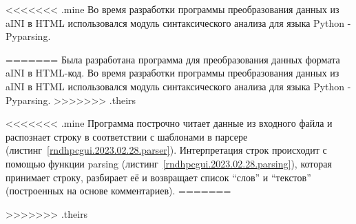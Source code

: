 \def\notedate{2023.02.28}
\def\currentauthor{Василян А.Р. (РК6-83Б)}


<<<<<<< .mine
Во время разработки программы преобразования данных из aINI в HTML использовался модуль синтаксического анализа для языка Python - Pyparsing.

=======
Была разработана программа для преобразования данных формата \textsf{aINI} в \textsf{HTML}-код.
Во время разработки программы преобразования данных из \textsf{aINI} в \textsf{HTML} использовался модуль синтаксического анализа для языка \textsf{Python} - \textsf{Pyparsing}. 
>>>>>>> .theirs

<<<<<<< .mine
Программа построчно читает данные из входного файла и распознает строку в соответствии с шаблонами в парсере (листинг~\ref{rndhpcgui.2023.02.28.parser}). Интерпретация строк происходит с помощью функции \textsf{parsing} (листинг~\ref{rndhpcgui.2023.02.28.parsing}), которая принимает строку, разбирает её и возвращает список ``слов'' и ``текстов'' (построенных на основе комментариев).%
=======

>>>>>>> .theirs

